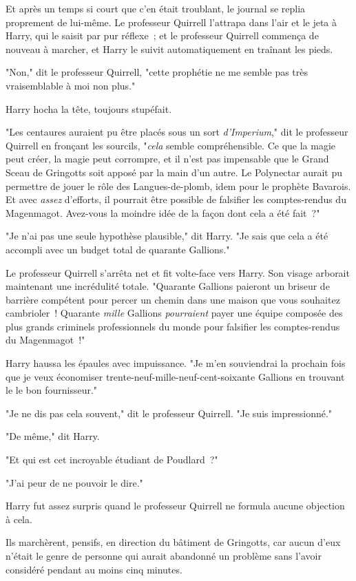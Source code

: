 Et après un temps si court que c'en était troublant, le journal se replia proprement de lui-même. Le professeur Quirrell l'attrapa dans l'air et le jeta à Harry, qui le saisit par pur réflexe~; et le professeur Quirrell commença de nouveau à marcher, et Harry le suivit automatiquement en traînant les pieds.

"Non," dit le professeur Quirrell, "cette prophétie ne me semble pas très vraisemblable à moi non plus."

Harry hocha la tête, toujours stupéfait.

"Les centaures auraient pu être placés sous un sort \emph{d'Imperium}," dit le professeur Quirrell en fronçant les sourcils, "\emph{cela} semble compréhensible. Ce que la magie peut créer, la magie peut corrompre, et il n'est pas impensable que le Grand Sceau de Gringotts soit apposé par la main d'un autre. Le Polynectar aurait pu permettre de jouer le rôle des Langues-de-plomb, idem pour le prophète Bavarois. Et avec \emph{assez} d'efforts, il pourrait être possible de falsifier les comptes-rendus du Magenmagot. Avez-vous la moindre idée de la façon dont cela a été fait~?"

"Je n'ai pas une seule hypothèse plausible," dit Harry. "Je sais que cela a été accompli avec un budget total de quarante Gallions."

Le professeur Quirrell s'arrêta net et fit volte-face vers Harry. Son visage arborait maintenant une incrédulité totale. "Quarante Gallions paieront un briseur de barrière compétent pour percer un chemin dans une maison que vous souhaitez cambrioler~! Quarante \emph{mille} Gallions \emph{pourraient} payer une équipe composée des plus grands criminels professionnels du monde pour falsifier les comptes-rendus du Magenmagot~!"

Harry haussa les épaules avec impuissance. "Je m'en souviendrai la prochain fois que je veux économiser trente-neuf-mille-neuf-cent-soixante Gallions en trouvant le le bon fournisseur."

"Je ne dis pas cela souvent," dit le professeur Quirrell. "Je suis impressionné."

"De même," dit Harry.

"Et qui est cet incroyable étudiant de Poudlard~?"

"J'ai peur de ne pouvoir le dire."

Harry fut assez surpris quand le professeur Quirrell ne formula aucune objection à cela.

Ils marchèrent, pensifs, en direction du bâtiment de Gringotts, car aucun d'eux n'était le genre de personne qui aurait abandonné un problème sans l'avoir considéré pendant au moins cinq minutes.

